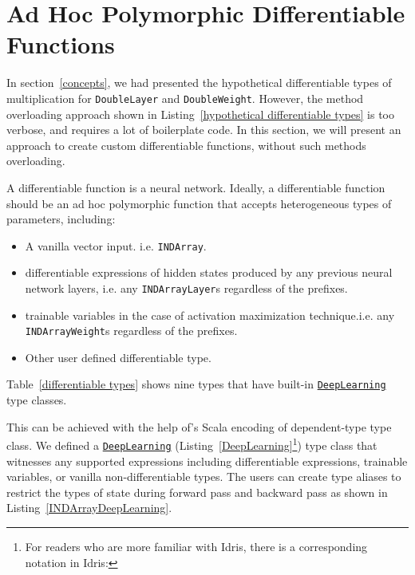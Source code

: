 \section{Ad Hoc Polymorphic Differentiable Functions}
\label{Ad Hoc Polymorphism} 

In section~\ref{concepts}, we had presented the hypothetical differentiable types of multiplication for \lstinline{DoubleLayer} and \lstinline{DoubleWeight}. However, the method overloading approach shown in Listing~\ref{hypothetical differentiable types} is too verbose, and requires a lot of boilerplate code. In this section, we will present an approach to create custom \glspl{differentiable function}, without such methods overloading.

A \gls{differentiable function} is a neural network. 
Ideally, a differentiable function should be an ad hoc polymorphic function that accepts heterogeneous types of parameters, including:

\begin{itemize}
  
  \item A vanilla vector input. i.e. \lstinline{INDArray}.

  \item \Glspl{differentiable expression} of hidden states produced by any previous neural network layers, i.e. any \lstinline{INDArrayLayer}s regardless of the prefixes.
  
  \item \Glspl{trainable variable} in the case of activation maximization technique\cite{erhan2009visualizing}.i.e. any \lstinline{INDArrayWeight}s regardless of the prefixes.
  
  \item Other user defined differentiable type.

\end{itemize}

Table~\ref{differentiable types} shows nine types that have built-in \href{https://javadoc.io/page/com.thoughtworks.deeplearning/deeplearning_2.11/latest/com/thoughtworks/deeplearning/DeepLearning.html}{\lstinline{DeepLearning}} type classes.

This can be achieved with the help of\cite{gurnelltype}'s Scala encoding of dependent-type type class. We defined a \href{https://javadoc.io/page/com.thoughtworks.deeplearning/deeplearning_2.11/latest/com/thoughtworks/deeplearning/DeepLearning.html}{\lstinline{DeepLearning}} (Listing~\ref{DeepLearning}\footnote{
For readers who are more familiar with Idris, there is a corresponding notation in Idris:
\par\usebox{\IdrisDeepLearning}
}) type class that witnesses any supported expressions including \glspl{differentiable expression}, \glspl{trainable variable}, or vanilla non-differentiable types. The users can create type aliases to restrict the types of state during forward pass and backward pass as shown in Listing~\ref{INDArrayDeepLearning}.

